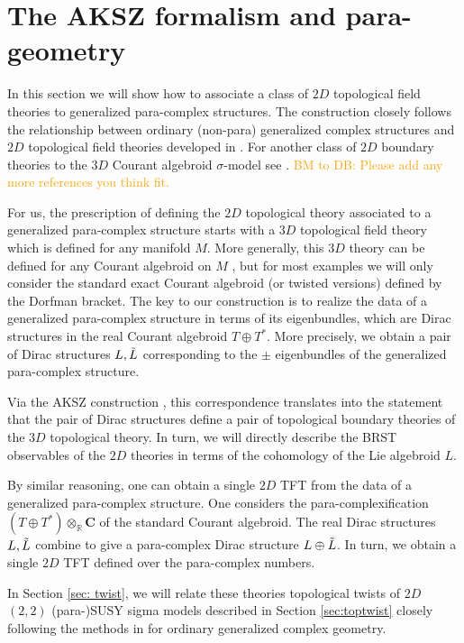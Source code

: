 \documentclass{article}
\newcommand{\TT}{{T\oplus T^*}}
\newcommand{\Cc}{\mathbf{C}}
\newcommand{\RR}{\mathbb{R}}
\theoremstyle{definition}
\theoremstyle{remark}
\def\btd{\textcolor{orange}{BM to DB: }\textcolor{orange}}
\begin{document}
 

\section{The AKSZ formalism and para-geometry}
\def\fg{\mathfrak{g}}
In this section we will show how to associate a class of $2D$ topological field theories to generalized para-complex structures.
The construction closely follows the relationship between ordinary (non-para) generalized complex structures \cite{Gualtieri:2003dx} and $2D$ topological field theories developed in \cite{Cattaneo:2009zx, Pestun:2006rj}.
For another class of $2D$ boundary theories to the $3D$ Courant algebroid $\sigma$-model see \cite{SeveraTduality}. \btd{Please add any more references you think fit.}

For us, the prescription of defining the $2D$ topological theory associated to a generalized para-complex structure starts with a $3D$ topological field theory which is defined for any manifold $M$. 
More generally, this $3D$ theory can be defined for any Courant algebroid on $M$ \cite{Roytenberg:2002nu}, but for most examples we will only consider the standard exact Courant algebroid (or twisted versions) defined by the Dorfman bracket.
The key to our construction is to realize the data of a generalized para-complex structure in terms of its eigenbundles, which are Dirac structures in the real Courant algebroid $\TT$.
More precisely, we obtain a pair of Dirac structures $L, \Tilde{L}$ corresponding to the $\pm$ eigenbundles of the generalized para-complex structure. 

Via the AKSZ construction \cite{AKSZ}, this correspondence translates into the statement that the pair of Dirac structures define a pair of topological boundary theories of the $3D$ topological theory.
In turn, we will directly describe the BRST observables of the $2D$ theories in terms of the cohomology of the Lie algebroid $L$. 

By similar reasoning, one can obtain a single $2D$ TFT from the data of a generalized para-complex structure. 
One considers the para-complexification $(\TT) \otimes_{\RR} \Cc$ of the standard Courant algebroid. 
The real Dirac structures $L, \Tilde{L}$ combine to give a para-complex Dirac structure $L \oplus \Tilde{L}$. 
In turn, we obtain a single $2D$ TFT defined over the para-complex numbers.

In Section \ref{sec: twist}, we will relate these theories topological twists of $2D$ $(2,2)$ (para-)SUSY sigma models described in Section \ref{sec:toptwist} closely following the methods in \cite{Kapustin:2004gv} for ordinary generalized complex geometry.
\end{document}
